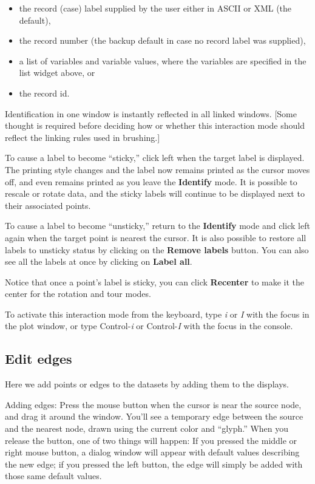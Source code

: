 \documentclass[11pt]{article}
\def\Widget#1{\textbf{#1}}
\begin{document}
\begin{itemize} \itemsep 0em
\item the record (case) label supplied by the user either in ASCII
      or XML (the default),
\item the record number (the backup default in case no record label was
      supplied),
\item a list of variables and variable values, where the variables are
      specified in the list widget above, or
\item the record id.
\end{itemize}

Identification in one window is instantly reflected in all linked
windows.  [Some thought is required before deciding how or whether
this interaction mode should reflect the linking rules used in
brushing.]

To cause a label to become ``sticky,'' click left when the target
label is displayed.  The printing style changes and the label now
remains printed as the cursor moves off, and even remains printed as
you leave the \Widget{Identify} mode.  It is possible to rescale or
rotate data, and the sticky labels will continue to be displayed next
to their associated points.

To cause a label to become ``unsticky,'' return to the \Widget{Identify}
mode and click left again when the target point is nearest the
cursor.  It is also possible to restore all labels to unsticky status
by clicking on the \Widget{Remove labels} button.  You can also see all
the labels at once by clicking on \Widget{Label all}.

Notice that once a point's label is sticky, you can click
\Widget{Recenter} to make it the center for the rotation and tour
modes.

To activate this interaction mode from the keyboard, type {\em i} or {\em I}
with the focus in the plot window, or type Control-{\em i} or
Control-{\em I} with the focus in the console.

\subsection{Edit edges}
\label{slbl:EditEdges}

Here we add points or edges to the datasets by adding them to
the displays.  

Adding edges: Press the mouse button when the cursor is near the
source node, and drag it around the window.  You'll see a temporary
edge between the source and the nearest node, drawn using the current
color and ``glyph.''  When you release the button, one of two things
will happen: If you pressed the middle or right mouse button, a dialog
window will appear with default values describing the new edge; if you
pressed the left button, the edge will simply be added with those same
default values.
\end{document}
